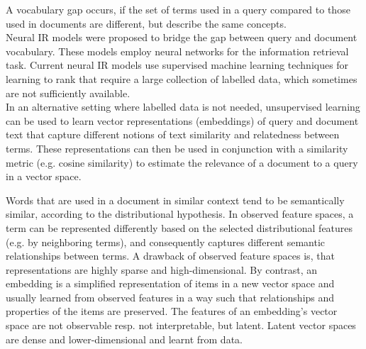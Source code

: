 A vocabulary gap occurs, if the set of terms used in a query compared to those used in documents are different, but describe the same concepts. \cite{van-gysel:2017:neural-vector-spaces}
\\Neural IR models were proposed to bridge the gap between query and document vocabulary.
These models employ neural networks for the information retrieval task.
Current neural IR models use supervised machine learning techniques for learning to rank that require a large collection of labelled data, which sometimes are not sufficiently available.
\\In an alternative setting where labelled data is not needed, unsupervised learning can be used to learn vector representations (embeddings) of query and document text that capture different notions of text similarity and relatedness between terms.
These representations can then be used in conjunction with a similarity metric (e.g. cosine similarity) to estimate the relevance of a document to a query in a vector space. \cite{mitra:2018:introduction-neural-ir}

Words that are used in a document in similar context tend to be semantically similar, according to the distributional hypothesis.
In observed feature spaces, a term can be represented differently based on the selected distributional features (e.g. by neighboring terms), and consequently captures different semantic relationships between terms.
A drawback of observed feature spaces is, that representations are highly sparse and high-dimensional.
By contrast, an embedding is a simplified representation of items in a new vector space and usually learned from observed features in a way such that relationships and properties of the items are preserved.
The features of an embedding’s vector space are not observable resp. not interpretable, but latent.
Latent vector spaces are dense and lower-dimensional and learnt from data. \cite{mitra:2018:introduction-neural-ir}

